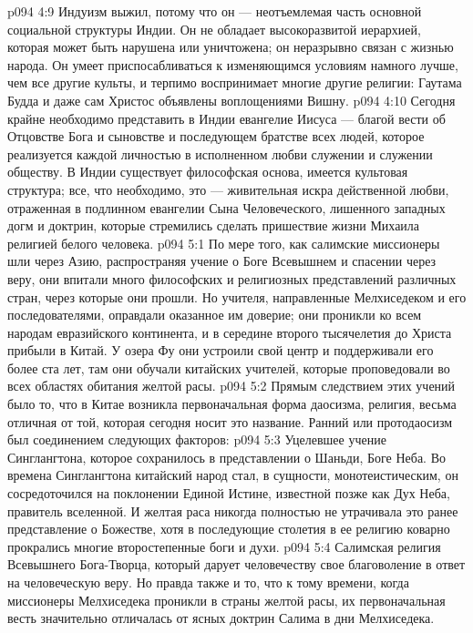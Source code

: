 \vs p094 4:9 Индуизм выжил, потому что он --- неотъемлемая часть основной социальной структуры Индии. Он не обладает высокоразвитой иерархией, которая может быть нарушена или уничтожена; он неразрывно связан с жизнью народа. Он умеет приспосабливаться к изменяющимся условиям намного лучше, чем все другие культы, и терпимо воспринимает многие другие религии: Гаутама Будда и даже сам Христос объявлены воплощениями Вишну.
\vs p094 4:10 Сегодня крайне необходимо представить в Индии евангелие Иисуса --- благой вести об Отцовстве Бога и сыновстве и последующем братстве всех людей, которое реализуется каждой личностью в исполненном любви служении и служении обществу. В Индии существует философская основа, имеется культовая структура; все, что необходимо, это --- живительная искра действенной любви, отраженная в подлинном евангелии Сына Человеческого, лишенного западных догм и доктрин, которые стремились сделать пришествие жизни Михаила религией белого человека.
\vs p094 5:1 По мере того, как салимские миссионеры шли через Азию, распространяя учение о Боге Всевышнем и спасении через веру, они впитали много философских и религиозных представлений различных стран, через которые они прошли. Но учителя, направленные Мелхиседеком и его последователями, оправдали оказанное им доверие; они проникли ко всем народам евразийского континента, и в середине второго тысячелетия до Христа прибыли в Китай. У озера Фу они устроили свой центр и поддерживали его более ста лет, там они обучали китайских учителей, которые проповедовали во всех областях обитания желтой расы.
\vs p094 5:2 Прямым следствием этих учений было то, что в Китае возникла первоначальная форма даосизма, религия, весьма отличная от той, которая сегодня носит это название. Ранний или протодаосизм был соединением следующих факторов:
\vs p094 5:3 \bibnobreakspace Уцелевшее учение Синглангтона, которое сохранилось в представлении о Шаньди, Боге Неба. Во времена Синглангтона китайский народ стал, в сущности, монотеистическим, он сосредоточился на поклонении Единой Истине, известной позже как Дух Неба, правитель вселенной. И желтая раса никогда полностью не утрачивала это ранее представление о Божестве, хотя в последующие столетия в ее религию коварно прокрались многие второстепенные боги и духи.
\vs p094 5:4 \pc {}\bibnobreakspace Салимская религия Всевышнего Бога\hyp{}Творца, который дарует человечеству свое благоволение в ответ на человеческую веру. Но правда также и то, что к тому времени, когда миссионеры Мелхиседека проникли в страны желтой расы, их первоначальная весть значительно отличалась от ясных доктрин Салима в дни Мелхиседека.
